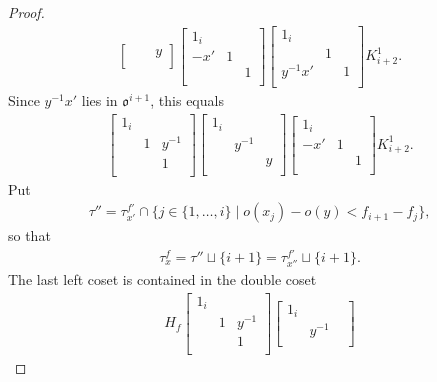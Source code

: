 \documentclass[11pt]{amsart}
\newcommand\oo{\mathfrak{o}}
\newcommand\1{\mathbf{1}}
\numberwithin{equation}{section}
\begin{document}
\begin{proof}
\begin{align*}
\begin{bmatrix}
 & &y  \\
\end{bmatrix}
\begin{bmatrix}
1_{i} & & \\
 -x' &1 &  \\
& &1  \\
\end{bmatrix} 
\begin{bmatrix}
1_{i} & & \\
 &1 &  \\
y^{-1}x' & &1 \\
\end{bmatrix} K_{i+2}^1.
\end{align*}
Since $y^{-1}x'$ lies in $\oo^{i+1}$, this equals
\begin{align*} 
\begin{bmatrix}
1_{i} & & \\
 &1 & y^{-1}  \\
 & &1  \\
\end{bmatrix}
\begin{bmatrix}
1_{i} & & \\
 &y^{-1} &  \\
 & &y  \\
\end{bmatrix}
\begin{bmatrix}
1_{i} & & \\
 -x' &1 &  \\
& &1  \\
\end{bmatrix} K_{i+2}^1.
\end{align*} 
Put
\begin{align*}
\tau'' = \tau_{x'}^{f'} \cap \{j \in \{1, \ldots, i \} \mid o(x_j) -o(y) < f_{i+1} -f_j \}, 
\end{align*} 
so that 
\begin{align}
\tau_x^f = \tau'' \sqcup \{i+1 \} = \tau_{x''}^{f'} \sqcup \{i+1 \}. \label{eq:tauxf}
\end{align} 
The last left coset is contained in the double coset
\begin{align*}
H_f \begin{bmatrix}
1_{i} & & \\
 &1 & y^{-1}  \\
 & &1  \\
\end{bmatrix}
\begin{bmatrix}
1_{i} & & \\
 &y^{-1} &  \\

\end{bmatrix}
\end{align*}
\end{proof}
\end{document}
